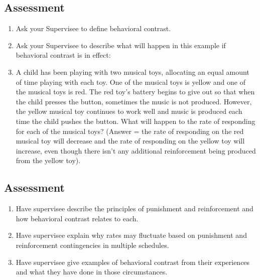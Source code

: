 \subsection{Assessment}
\begin{enumerate}
\item Ask your Supervisee to define behavioral contrast.
\item Ask your Supervisee to describe what will happen in this example if behavioral contrast is in effect: 
\item A child has been playing with two musical toys, allocating an equal amount of time playing with each toy. One of the musical toys is yellow and one of the musical toys is red. The red toy's battery begins to give out so that when the child presses the button, sometimes the music is not produced. However, the yellow musical toy continues to work well and music is produced each time the child pushes the button. What will happen to the rate of responding for each of the musical toys? (Answer = the rate of responding on the red musical toy will decrease and the rate of responding on the yellow toy will increase, even though there isn't any additional reinforcement being produced from the yellow toy).
\end{enumerate}
%
\subsection{Assessment}
\begin{enumerate}
\item Have supervisee describe the principles of punishment and reinforcement and how behavioral contrast relates to each.
\item Have supervisee explain why rates may fluctuate based on punishment and reinforcement contingencies in multiple schedules.
\item Have supervisee give examples of behavioral contrast from their experiences and what they have done in those circumstances.
%
\end{enumerate}
%
